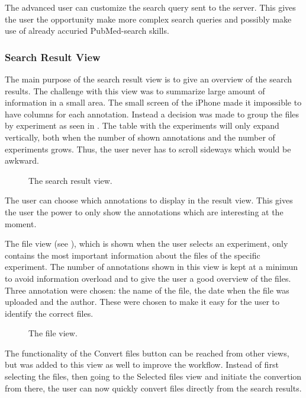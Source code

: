 The advanced user can customize the search query sent to the server. This gives the user the opportunity make more complex search queries and possibly make use of already accuried PubMed-search skills.

\subsubsection{Search Result View}
The main purpose of the search result view is to give an overview of the search results. The challenge with this view was to summarize large amount of information in a small area. The small screen of the iPhone made it impossible to have columns for each annotation. Instead a decision was made to group the files by experiment as seen in . The table with the experiments will only expand vertically, both when the number of shown annotations and the number of experiments grows. Thus, the user never has to scroll sideways which would be awkward.

\begin{figure}[ht]
\caption{The search result view.}
\label{fig:ios_searchResult2}
\end{figure}
\FloatBarrier

The user can choose which annotations to display in the result view. This gives the user the power to only show the annotations which are interesting at the moment. 

The file view (see ), which is shown when the user selects an experiment, only contains the most important information about the files of the specific experiment. The number of annotations shown in this view is kept at a minimun to avoid information overload and to give the user a good overview of the files. Three annotation were chosen: the name of the file, the date when the file was uploaded and the author. These were chosen to make it easy for the user to identify the correct files.

\begin{figure}[ht]
\caption{The file view.}
\label{fig:ios_files2}
\end{figure}
\FloatBarrier

The functionality of the Convert files button can be reached from other views, but was added to this view as well to improve the workflow. Instead of first selecting the files, then going to the Selected files view and initiate the convertion from there, the user can now quickly convert files directly from the search results.



